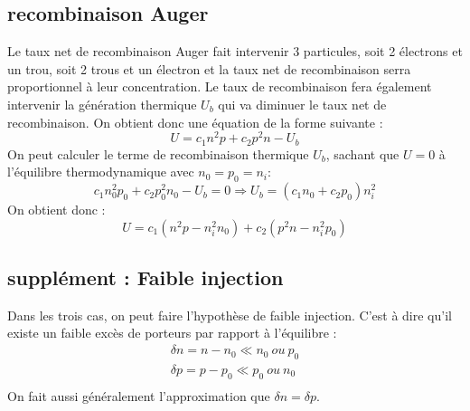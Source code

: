 \subsection{recombinaison Auger}
Le taux net de recombinaison Auger fait intervenir 3 particules, soit 2 électrons et un trou, soit 2 trous et un électron et la taux net de recombinaison serra proportionnel à leur concentration. Le taux de recombinaison fera également intervenir la génération thermique $U_b$ qui va diminuer le taux net de recombinaison. On obtient donc une équation de la forme suivante : 
\begin{equation}
U=c_1n^2p+c_2p^2n-U_b
\end{equation}
On peut calculer le terme de recombinaison thermique $U_b$, sachant que $U=0$ à l'équilibre thermodynamique avec $n_0=p_0=n_i$:
\begin{equation}
c_1n_0^2p_0+c_2p_0^2n_0-U_b=0 \Rightarrow U_b=(c_1n_0+c_2p_0)n_i^2
\end{equation}
On obtient donc :
\begin{equation}
U=c_1(n^2p-n_i^2n_0)+c_2(p^2n-n_i^2p_0)
\end{equation}
\subsection{supplément : Faible injection}
Dans les trois cas, on peut faire l'hypothèse de faible injection. C'est à dire qu'il existe un faible excès de porteurs par rapport à l'équilibre :
\begin{equation}
\begin{array}{c}
\delta n=n-n_0 \ll n_0 ~ou~ p_0 \\
\delta p=p-p_0 \ll p_0 ~ou~ n_0 \\
\end{array} 
\end{equation}
On fait aussi généralement l'approximation que $\delta n=\delta p$.
